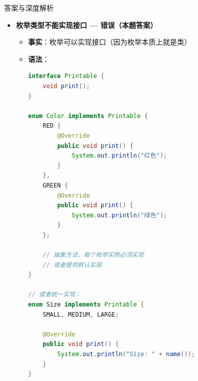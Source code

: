 \documentclass[12pt, a4paper]{ctexart}
\begin{document}
\begin{enumerate}[label=\textbf{\arabic*.}]
\begin{bluebox}{答案与深度解析}
\begin{itemize}[leftmargin=*, nosep, label={}]
\begin{itemize}[label={}, leftmargin=*, nosep]
\begin{lstlisting}[language=Java]
    private final double mass;   // 质量
    private final double radius; // 半径

    // 构造方法
    private Planet(double mass, double radius) {
        this.mass = mass;
        this.radius = radius;
    }

    public double getMass() {
        return mass;
    }
}

// 使用
Planet p = Planet.EARTH;
System.out.println(p.getMass());  // 5.98E24
				            \end{lstlisting}
				            \item \textbf{字节码证据}：构造方法声明为private
			            \end{itemize}

			      \item[D] \textbf{枚举类型不能实现接口 — 错误（本题答案）}
			            \begin{itemize}[label={}, leftmargin=*, nosep]
				            \item \textbf{事实}：枚举可以实现接口（因为枚举本质上就是类）
				            \item \textbf{语法}：
				                  \begin{lstlisting}[language=Java]
interface Printable {
    void print();
}

enum Color implements Printable {
    RED {
        @Override
        public void print() {
            System.out.println("红色");
        }
    },
    GREEN {
        @Override
        public void print() {
            System.out.println("绿色");
        }
    };

    // 抽象方法，每个枚举实例必须实现
    // 或者提供默认实现
}

// 或者统一实现：
enum Size implements Printable {
    SMALL, MEDIUM, LARGE;

    @Override
    public void print() {
        System.out.println("Size: " + name());
    }
}


\end{lstlisting}
\end{itemize}
\end{itemize}
\end{bluebox}
\end{enumerate}
\end{document}
